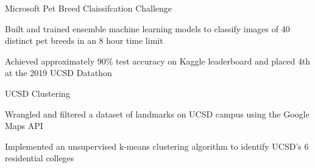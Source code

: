 
\begin{cventries}
  \cventry
    {} %
    {Microsoft Pet Breed Claissifcation Challenge} %
    {} %
    {} %
    {
      \begin{cvitems} %
        \item {Built and trained ensemble machine learning models to classify images of 40 distinct pet breeds in an 8 hour time limit}
		\item {Achieved approximately 90\% test accuracy on Kaggle leaderboard and placed 4th at the 2019 UCSD Datathon}
      \end{cvitems}
    }

  \cventry
    {} %
    {UCSD Clustering} %
    {} %
    {} %
    {
      \begin{cvitems} %
      	\item {Wrangled and filtered a dataset of landmarks on UCSD campus using the Google Maps API}
		\item {Implemented an unsupervised k-means clustering algorithm to identify UCSD’s 6 residential colleges}
      \end{cvitems}
    }
\end{cventries}